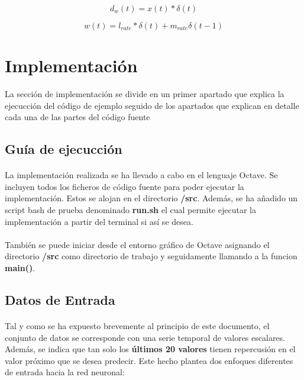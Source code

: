 \documentclass[10pt, a4paper,spanish]{article}
\begin{document}
			\begin{equation}
				d_w(t) = x(t) * \delta(t)
			\end{equation}

			\begin{equation}
				w(t) = l_{rate} * \delta(t) + m_{rate}\delta(t-1)
			\end{equation}

	\section{Implementación}

		La sección de implementación se divide en un primer apartado que explica la ejecucción del código de ejemplo seguido de los apartados que explican en detalle cada una de las partes del código fuente


		\subsection{Guía de ejecucción}

			\paragraph{}
			La implementación realizada se ha llevado a cabo en el lenguaje Octave. Se incluyen todos los ficheros de código fuente para poder ejecutar la implementación. Estos se alojan en el directorio \textbf{/src}. Además, se ha añadido un script bash de prueba denominado \textbf{run.sh} el cual permite ejecutar la implementación a partir del terminal si así se desea.

			\paragraph{}
			También se puede iniciar desde el entorno gráfico de Octave asignando el directorio \textbf{/src} como directorio de trabajo y seguidamente llamando a la funcion \textbf{main()}.


		\subsection{Datos de Entrada}

			\paragraph{}
			Tal y como se ha expuesto brevemente al principio de este documento, el conjunto de datos se corresponde con una serie temporal de valores escalares. Además, se indica que tan solo los \textbf{últimos 20 valores} tienen repercusión en el valor próximo que se desea predecir. Este hecho plantea dos enfoques diferentes de entrada hacia la red neuronal:
\end{document}
